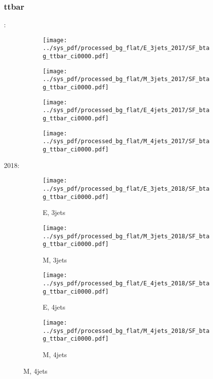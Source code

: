 \documentclass{beamer}
\begin{document}
\begin{frame}
\frametitle{ttbar}
\fontsize{5}{1}:
\begin{figure}
\centering
\begin{subfigure}[b]{0.24\textwidth}
\texttt{[image: ../sys\_pdf/processed\_bg\_flat/E\_3jets\_2017/SF\_btag\_ttbar\_ci0000.pdf]}
\end{subfigure}
\begin{subfigure}[b]{0.24\textwidth}
\texttt{[image: ../sys\_pdf/processed\_bg\_flat/M\_3jets\_2017/SF\_btag\_ttbar\_ci0000.pdf]}
\end{subfigure}
\begin{subfigure}[b]{0.24\textwidth}
\texttt{[image: ../sys\_pdf/processed\_bg\_flat/E\_4jets\_2017/SF\_btag\_ttbar\_ci0000.pdf]}
\end{subfigure}
\begin{subfigure}[b]{0.24\textwidth}
\texttt{[image: ../sys\_pdf/processed\_bg\_flat/M\_4jets\_2017/SF\_btag\_ttbar\_ci0000.pdf]}
\end{subfigure}
\end{figure}
2018:
\begin{figure}
\centering
\begin{subfigure}[b]{0.24\textwidth}
\texttt{[image: ../sys\_pdf/processed\_bg\_flat/E\_3jets\_2018/SF\_btag\_ttbar\_ci0000.pdf]}
\captionsetup{font=tiny}
\caption{E, 3jets}
\end{subfigure}
\begin{subfigure}[b]{0.24\textwidth}
\texttt{[image: ../sys\_pdf/processed\_bg\_flat/M\_3jets\_2018/SF\_btag\_ttbar\_ci0000.pdf]}
\captionsetup{font=tiny}
\caption{M, 3jets}
\end{subfigure}
\begin{subfigure}[b]{0.24\textwidth}
\texttt{[image: ../sys\_pdf/processed\_bg\_flat/E\_4jets\_2018/SF\_btag\_ttbar\_ci0000.pdf]}
\captionsetup{font=tiny}
\caption{E, 4jets}
\end{subfigure}
\begin{subfigure}[b]{0.24\textwidth}
\texttt{[image: ../sys\_pdf/processed\_bg\_flat/M\_4jets\_2018/SF\_btag\_ttbar\_ci0000.pdf]}
\captionsetup{font=tiny}
\caption{M, 4jets}
\end{subfigure}
\end{figure}
\end{frame}
\end{document}
